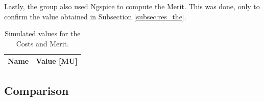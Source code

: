 Lastly, the group also used Ngspice to compute the Merit. This was done, only to confirm
the value obtained in Subsection \ref{subsec:res_the}.

\begin{table}[ht]
	\centering
	\begin{tabular}{|l|r|}
		\hline    
		{\bf Name} & {\bf Value [MU]} \\ \hline
    		
	\end{tabular}
	
	\caption{Simulated values for the Costs and Merit.}
    
\label{tab:op}
\end{table}



\subsection{Comparison}






